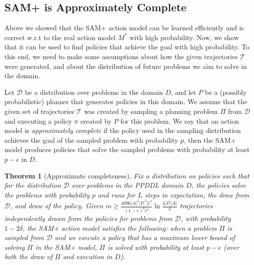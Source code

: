 \documentclass[letterpaper]{article} %
\newtheorem{theorem}{Theorem}
\begin{document}
\subsection{SAM+ is Approximately Complete}

Above we showed that the SAM+ action model can be learned efficiently and is correct w.r.t to the real action model $M^*$ with high probability. 
Now, we show that it can be used to find policies that achieve the goal with high probability. 
To this end, we need to make some assumptions about how the given trajectories $\mathcal{T}$ were generated, and about the distribution of future problems we aim to solve in the domain. 


Let $\mathcal{D}$ be a distribution over problems in the domain $D$, 
and let $P$ be a (possibly probabilistic) planner that generates policies in this domain. 
We assume that the given set of trajectories $\mathcal{T}$ was created by sampling a planning problem $\Pi$ from $\mathcal{D}$ and executing a policy $\pi$ created by $P$ for this problem. %
We say that an action model is \emph{approximately complete} if the policy used in the sampling distribution achieves the goal of the sampled problem with probability $p$, then the SAM+ model produces policies that solve the sampled problems with probability at least $p-\epsilon$ in $D$.

\begin{theorem}[Approximate completeness]
\label{thm:sam-ac}
Fix a distribution on policies such that for the distribution $\mathcal{D}$ over problems 
in the PPDDL domain $D$, the policies solve the problems with probability $p$ and runs for $L$ steps in expectation, the draw from $\mathcal{D}$, and draw of the policy.
Given 
$
m\geq \frac{4096|A|^2|F|^3L^2}{(1-\epsilon)^4\epsilon^4}\ln\frac{4|F||A|}{\delta}
$
trajectories independently drawn from the policies for problems from $\mathcal{D}$, 
with probability $1-2\delta$, the SAM+ action model satisfies the following: 
when a problem $\Pi$ is sampled from $\mathcal{D}$ 
and we execute a policy that has a maximum lower bound of solving $\Pi$ in the SAM+ model, 
$\Pi$ is solved with probability at least $p-\epsilon$ (over both the draw of $\Pi$ and execution in $D$).
\end{theorem}
\end{document}
